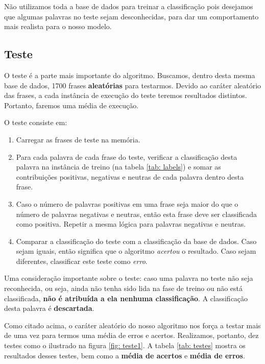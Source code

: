\documentclass[
article,			%
12pt,				%
a4paper,			%
english,			%
brazil,				%
sumario=tradicional,
twoside
]{abntex2}
\begin{document}
	Não utilizamos toda a base de dados para treinar a classificação pois desejamos que algumas palavras no teste sejam desconhecidas, para dar um comportamento mais realista para o nosso modelo.
	
	\subsection{Teste}
	
	\label{teste}
	O teste é a parte mais importante do algoritmo. Buscamos, dentro desta mesma base de dados, 1700 frases \textbf{aleatórias} para testarmos. Devido ao caráter aleatório das frases, a cada instância de execução do teste teremos resultados distintos. Portanto, faremos uma média de execução.
	
	O teste consiste em:
	\begin{enumerate}
		\item Carregar as frases de teste na memória.
		\item Para cada palavra de cada frase do teste, verificar a classificação desta palavra na instância de treino (na tabela \ref{tab: labels}) e somar as contribuições positivas, negativas e neutras de cada palavra dentro desta frase.
		\item Caso o número de palavras positivas em uma frase seja maior do que o número de palavras negativas e neutras, então esta frase deve ser classificada como positiva. Repetir a mesma lógica para palavras negativas e neutras.
		\item Comparar a classificação do teste com a classificação da base de dados. Caso sejam iguais, então significa que o algoritmo \emph{acertou} o resultado. Caso sejam diferentes, classificar este teste como \emph{erro}.
	\end{enumerate}

		Uma consideração importante sobre o teste: caso uma palavra no teste não seja reconhecida, ou seja, ainda não tenha sido lida na fase de treino ou não está classificada, \textbf{não é atribuída a ela nenhuma classificação}. A classificação desta palavra é \textbf{descartada}.
		
		Como citado acima, o caráter aleatório do nosso algoritmo nos força a testar mais de uma vez para termos uma média de erros e acertos. Realizamos, portanto, dez testes como o ilustrado na figura \ref{fig: teste1}. A tabela \ref{tab: testes} mostra os resultados desses testes, bem como a \textbf{média de acertos} e \textbf{média de erros}.  
		
\end{document}
